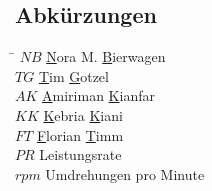 \subsection*{Abk\"urzungen}
\begin{tabbing}
\hspace*{2cm}\=\kill
$NB$ \> \underline{N}ora M. \underline{B}ierwagen \\[0.2ex]
$TG$ \> \underline{T}im \underline{G}otzel \\[0.2ex]
$AK$ \> \underline{A}miriman \underline{K}ianfar \\[0.2ex]
$KK$ \> \underline{K}ebria \underline{K}iani \\[0.2ex]
$FT$ \> \underline{F}lorian \underline{T}imm \\[0.2ex]

$PR$ \> Leistungsrate \\[0.2ex]
$rpm$ \> Umdrehungen pro Minute \\[0.2ex]
\end{tabbing}

